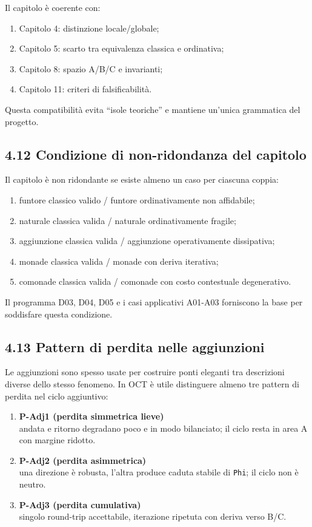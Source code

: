 Il capitolo è coerente con:

\begin{enumerate}
\def\labelenumi{\arabic{enumi}.}
\tightlist
\item
  Capitolo 4: distinzione locale/globale;
\item
  Capitolo 5: scarto tra equivalenza classica e ordinativa;
\item
  Capitolo 8: spazio A/B/C e invarianti;
\item
  Capitolo 11: criteri di falsificabilità.
\end{enumerate}

Questa compatibilità evita ``isole teoriche'' e mantiene un'unica grammatica del progetto.

\subsection{4.12 Condizione di non-ridondanza del capitolo}

Il capitolo è non ridondante se esiste almeno un caso per ciascuna coppia:

\begin{enumerate}
\def\labelenumi{\arabic{enumi}.}
\tightlist
\item
  funtore classico valido / funtore ordinativamente non affidabile;
\item
  naturale classica valida / naturale ordinativamente fragile;
\item
  aggiunzione classica valida / aggiunzione operativamente dissipativa;
\item
  monade classica valida / monade con deriva iterativa;
\item
  comonade classica valida / comonade con costo contestuale degenerativo.
\end{enumerate}

Il programma D03, D04, D05 e i casi applicativi A01-A03 forniscono la base per soddisfare questa condizione.

\subsection{4.13 Pattern di perdita nelle aggiunzioni}

Le aggiunzioni sono spesso usate per costruire ponti eleganti tra descrizioni diverse dello stesso fenomeno. In OCT è utile distinguere almeno tre pattern di perdita nel ciclo aggiuntivo:

\begin{enumerate}
\def\labelenumi{\arabic{enumi}.}
\item
  \textbf{P-Adj1 (perdita simmetrica lieve)}\\
  andata e ritorno degradano poco e in modo bilanciato; il ciclo resta in area A con margine ridotto.
\item
  \textbf{P-Adj2 (perdita asimmetrica)}\\
  una direzione è robusta, l'altra produce caduta stabile di \texttt{Phi}; il ciclo non è neutro.
\item
  \textbf{P-Adj3 (perdita cumulativa)}\\
  singolo round-trip accettabile, iterazione ripetuta con deriva verso B/C.
\end{enumerate}

